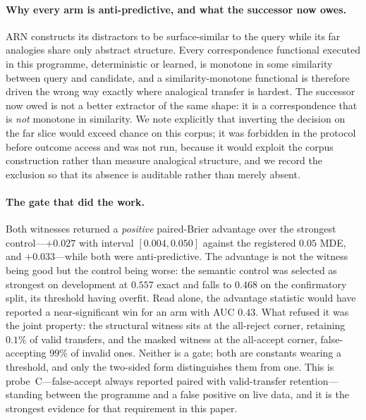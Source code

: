 \paragraph{Why every arm is anti-predictive, and what the successor now owes.} ARN constructs its distractors to be surface-similar to the query while its far analogies share only abstract structure. Every correspondence functional executed in this programme, deterministic or learned, is monotone in some similarity between query and candidate, and a similarity-monotone functional is therefore driven the wrong way exactly where analogical transfer is hardest. The successor now owed is not a better extractor of the same shape: it is a correspondence that is \emph{not} monotone in similarity. We note explicitly that inverting the decision on the far slice would exceed chance on this corpus; it was forbidden in the protocol before outcome access and was not run, because it would exploit the corpus construction rather than measure analogical structure, and we record the exclusion so that its absence is auditable rather than merely absent.

\paragraph{The gate that did the work.} Both witnesses returned a \emph{positive} paired-Brier advantage over the strongest control---$+0.027$ with interval $[0.004,0.050]$ against the registered $0.05$ MDE, and $+0.033$---while both were anti-predictive. The advantage is not the witness being good but the control being worse: the semantic control was selected as strongest on development at $0.557$ exact and falls to $0.468$ on the confirmatory split, its threshold having overfit. Read alone, the advantage statistic would have reported a near-significant win for an arm with AUC $0.43$. What refused it was the joint property: the structural witness sits at the all-reject corner, retaining $0.1\%$ of valid transfers, and the masked witness at the all-accept corner, false-accepting $99\%$ of invalid ones. Neither is a gate; both are constants wearing a threshold, and only the two-sided form distinguishes them from one. This is probe~C---false-accept always reported paired with valid-transfer retention---standing between the programme and a false positive on live data, and it is the strongest evidence for that requirement in this paper.
